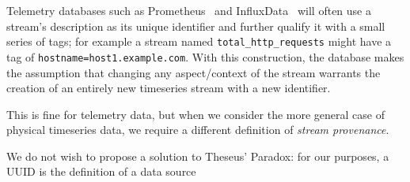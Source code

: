 
Telemetry databases such as Prometheus~\cite{prometheus} and
InfluxData~\cite{influxdata} will often use a stream's description as its
unique identifier and further qualify it with a small series of tags; for
example a stream named \texttt{total\_http\_requests} might have a tag of
\texttt{hostname=host1.example.com}. With this construction, the database makes
the assumption that changing any aspect/context of the stream warrants the
creation of an entirely new timeseries stream with a new identifier. 

This is fine for telemetry data, but when we consider the more general case of
physical timeseries data, we require a different definition of \emph{stream
provenance}.

We do not wish to propose a solution to Theseus' Paradox: for our purposes, a UUID is the definition of
a data source
